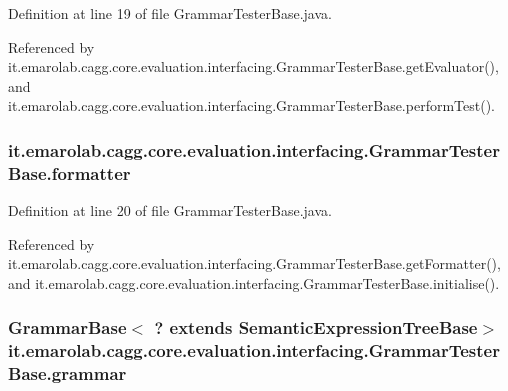 Definition at line 19 of file Grammar\-Tester\-Base.\-java.



Referenced by it.\-emarolab.\-cagg.\-core.\-evaluation.\-interfacing.\-Grammar\-Tester\-Base.\-get\-Evaluator(), and it.\-emarolab.\-cagg.\-core.\-evaluation.\-interfacing.\-Grammar\-Tester\-Base.\-perform\-Test().

\hypertarget{classit_1_1emarolab_1_1cagg_1_1core_1_1evaluation_1_1interfacing_1_1GrammarTesterBase_a75f3a37db0c23ff1d1f29df7424fe9e4}{
\subsubsection[{formatter}]{ it.\-emarolab.\-cagg.\-core.\-evaluation.\-interfacing.\-Grammar\-Tester\-Base.\-formatter\hspace{0.3cm}{\ttfamily [private]}}}\label{classit_1_1emarolab_1_1cagg_1_1core_1_1evaluation_1_1interfacing_1_1GrammarTesterBase_a75f3a37db0c23ff1d1f29df7424fe9e4}


Definition at line 20 of file Grammar\-Tester\-Base.\-java.



Referenced by it.\-emarolab.\-cagg.\-core.\-evaluation.\-interfacing.\-Grammar\-Tester\-Base.\-get\-Formatter(), and it.\-emarolab.\-cagg.\-core.\-evaluation.\-interfacing.\-Grammar\-Tester\-Base.\-initialise().

\hypertarget{classit_1_1emarolab_1_1cagg_1_1core_1_1evaluation_1_1interfacing_1_1GrammarTesterBase_ac6601808f37ef4327e6308143f01dc6a}{
\subsubsection[{grammar}]{\setlength{\rightskip}{0pt plus 5cm}Grammar\-Base$<$ ? extends {\bf Semantic\-Expression\-Tree\-Base}$>$ it.\-emarolab.\-cagg.\-core.\-evaluation.\-interfacing.\-Grammar\-Tester\-Base.\-grammar\hspace{0.3cm}{\ttfamily [private]}}}\label{classit_1_1emarolab_1_1cagg_1_1core_1_1evaluation_1_1interfacing_1_1GrammarTesterBase_ac6601808f37ef4327e6308143f01dc6a}


